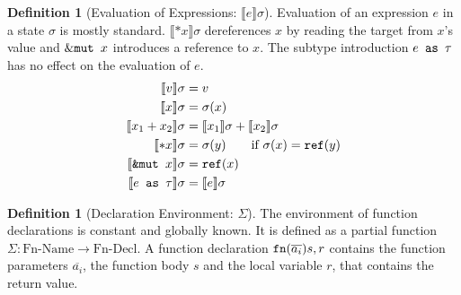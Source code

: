 \documentclass[twoside, english]{sdqthesis}
\newcommand{\bbracket}[1]{\llbracket #1 \rrbracket}
\theoremstyle{definition}
\newtheorem{definition}[theorem]{Definition}
\begin{document}
\begin{definition}[Evaluation of Expressions: $\bbracket{e} \sigma$]
Evaluation of an expression $e$ in a state $\sigma$ is mostly standard. $\bbracket{*x}\sigma$ dereferences $x$ by reading the target from $x$'s value and $\&\code{mut } x$ introduces a reference to $x$. The subtype introduction $e \code{ as }\tau$ has no effect on the evaluation of $e$.
\begin{align*}
  \bbracket{v} \sigma &= v \\
  \bbracket{x} \sigma &= \sigma(x) \\
  \bbracket{x_1 + x_2} \sigma &= \bbracket{x_1} \sigma + \bbracket{x_2} \sigma \\
  \bbracket{*x} \sigma &= \sigma(y) \qquad \text{if } \sigma(x) = \code{ref}(y) \\
  \bbracket{\code{\&mut } x} \sigma &= \code{ref}(x) \\
  \bbracket{e \code{ as } \tau} \sigma &= \bbracket{e}\sigma \\
\end{align*}
\end{definition}
 

\begin{definition}[Declaration Environment: $\Sigma$]
  The environment of function declarations is constant and globally known. It is defined as a partial function $\Sigma : \text{Fn-Name} \to \text{Fn-Decl}$. A function declaration $\code{fn}(\overline{a_i}) {s, r}$ contains the function parameters $\overline{a_i}$, the function body $s$ and the local variable $r$, that contains the return value.
\end{definition}
\end{document}
